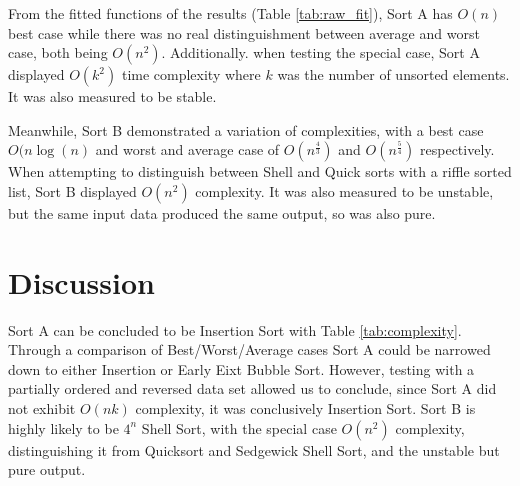 \documentclass[a4paper]{scrartcl}
\begin{document}
From the fitted functions of the results (Table \ref{tab:raw_fit}), Sort A has \(O(n)\) best case while there was no real distinguishment between average and worst case, both being \(O(n^2)\). Additionally. when testing the special case, Sort A displayed \(O(k^2)\) time complexity where \(k\) was the number of unsorted elements. It was also measured to be stable.

Meanwhile, Sort B demonstrated a variation of complexities, with a best case \(O(n \log(n)\) and worst and average case of \(O(n^\frac43)\) and \(O(n^\frac54)\) respectively. When attempting to distinguish between Shell and Quick sorts with a riffle sorted list, Sort B displayed \(O(n^2)\) complexity. It was also measured to be unstable, but the same input data produced the same output, so was also pure.

\section{Discussion}
Sort A can be concluded to be Insertion Sort with Table \ref{tab:complexity}. Through a comparison of Best/Worst/Average cases Sort A could be narrowed down to either Insertion or Early Eixt Bubble Sort. However, testing with a partially ordered and reversed data set allowed us to conclude, since Sort A did not exhibit \(O(n k)\) complexity, it was conclusively Insertion Sort. Sort B is highly likely to be \(4^n\) Shell Sort, with the special case \(O(n^2)\) complexity, distinguishing it from Quicksort and Sedgewick Shell Sort, and the unstable but pure output.
\end{document}

